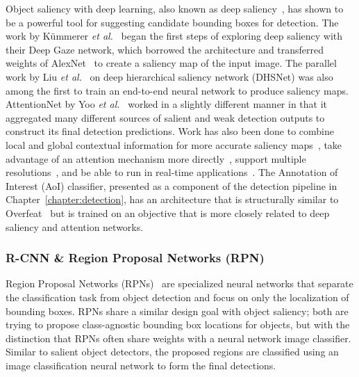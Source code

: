 Object saliency with deep learning, also known as deep saliency~\cite{he_supercnn:_2015, li_lcnn:_2015,borji_salient_2015,jiang_salient_2013,liu_ssd:_2016,li_deepsaliency:_2016}, has shown to be a powerful tool for suggesting candidate bounding boxes for detection.  The work by K\"{u}mmerer \textit{et al.}~\cite{kummerer_deep_2014,kummerer_deepgaze_2016} began the first steps of exploring deep saliency with their Deep Gaze network, which borrowed the architecture and transferred weights of AlexNet~\cite{krizhevsky_imagenet_2012} to create a saliency map of the input image.  The parallel work by Liu \textit{et al.}~\cite{liu_dhsnet_2016} on deep hierarchical saliency network (DHSNet) was also among the first to train an end-to-end neural network to produce saliency maps.  AttentionNet by Yoo \textit{et al.}~\cite{yoo_attentionnet:_2015} worked in a slightly different manner in that it aggregated many different sources of salient and weak detection outputs to construct its final detection predictions.  Work has also been done to combine local and global contextual information for more accurate saliency maps~\cite{zhao_saliency_2015,chu_multi-context_2017,wang_attention-based_2017,spain_modeling_2011}, take advantage of an attention mechanism more directly~\cite{yoo_attentionnet:_2015,zhang_progressive_2018,hara_attentional_2017,kosiorek_hierarchical_2017,wang_survey_2016,wang_deep_2018}, support multiple resolutions~\cite{liu_mr-cnn_2019,wang_salient_2019,zhao_pyramid_2019}, and be able to run in real-time applications~\cite{diao_efficient_2016, fan_shifting_2019,liu_simple_2019}.  The Annotation of Interest (AoI) classifier, presented as a component of the detection pipeline in Chapter~\ref{chapter:detection}, has an architecture that is structurally similar to Overfeat~\cite{sermanet_overfeat:_2013} but is trained on an objective that is more closely related to deep saliency and attention networks.

\subsubsection{R-CNN \& Region Proposal Networks (RPN)}

Region Proposal Networks (RPNs)~\cite{cho_unsupervised_2015,bazzani_self-taught_2016} are specialized neural networks that separate the classification task from object detection and focus on only the localization of bounding boxes.  RPNs share a similar design goal with object saliency; both are trying to propose class-agnostic bounding box locations for objects, but with the distinction that RPNs often share weights with a neural network image classifier.  Similar to salient object detectors, the proposed regions are classified using an image classification neural network to form the final detections.

